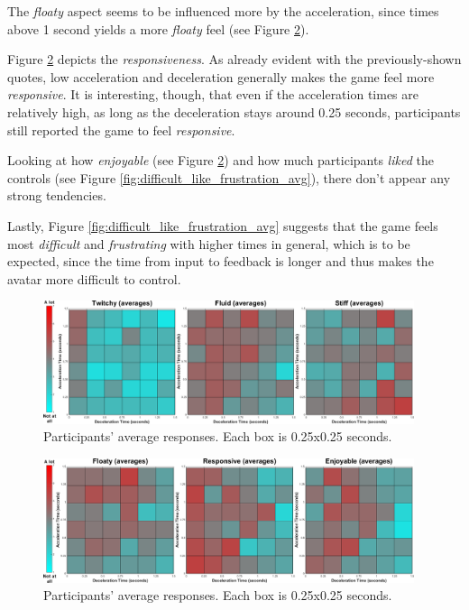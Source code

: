 The \textit{floaty} aspect seems to be influenced more by the acceleration, since times above 1 second yields a more \textit{floaty} feel (see Figure \ref{fig:floaty_responsive_enjoyable_avg}).

Figure \ref{fig:floaty_responsive_enjoyable_avg} depicts the \textit{responsiveness}. As already evident with the previously-shown quotes, low acceleration and deceleration generally makes the game feel more \textit{responsive}. It is interesting, though, that even if the acceleration times are relatively high, as long as the deceleration stays around 0.25 seconds, participants still reported the game to feel \textit{responsive}.

Looking at how \textit{enjoyable} (see Figure \ref{fig:floaty_responsive_enjoyable_avg}) and how much participants \textit{liked} the controls (see Figure \ref{fig:difficult_like_frustration_avg}), there don't appear any strong tendencies.

Lastly, Figure \ref{fig:difficult_like_frustration_avg} suggests that the game feels most \textit{difficult} and \textit{frustrating} with higher times in general, which is to be expected, since the time from input to feedback is longer and thus makes the avatar more difficult to control.

\begin{figure}[!htb]
\centering
\includegraphics[width=0.97\textwidth]{Pics/Classes/averages/twitchy_fluid_stiff_avg}
\caption{Participants' average responses. Each box is 0.25x0.25 seconds.}
\label{fig:twitchy_fluid_stiff_avg}
\end{figure}

\begin{figure}[!htb]
\centering
\includegraphics[width=0.97\textwidth]{Pics/Classes/averages/floaty_responsive_enjoyable_avg.png}
\caption{Participants' average responses. Each box is 0.25x0.25 seconds.}
\label{fig:floaty_responsive_enjoyable_avg}
\end{figure}

